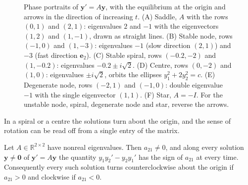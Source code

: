 \begin{figure}
{}
\caption{Phase portraits of $\mathbf y'=A\mathbf y$, with the equilibrium at the origin and arrows in the direction of increasing $t$. (A) Saddle, $A$ with the rows $(0,1)$ and $(2,1)$: eigenvalues $2$ and $-1$ with the eigenvectors $(1,2)$ and $(1,-1)$, drawn as straight lines. (B) Stable node, rows $(-1,0)$ and $(1,-3)$: eigenvalues $-1$ (slow direction $(2,1)$) and $-3$ (fast direction $\mathbf e_2$). (C) Stable spiral, rows $(-0.2,-2)$ and $(1,-0.2)$: eigenvalues $-0.2\pm i\sqrt2$. (D) Centre, rows $(0,-2)$ and $(1,0)$: eigenvalues $\pm i\sqrt2$, orbits the ellipses $y_1^2+2y_2^2=c$. (E) Degenerate node, rows $(-2,1)$ and $(-1,0)$: double eigenvalue $-1$ with the single eigenvector $(1,1)$. (F) Star, $A=-I$. For the unstable node, spiral, degenerate node and star, reverse the arrows.\label{fig:phase-portraits}}
\end{figure}

In a spiral or a centre the solutions turn about the origin, and the sense of rotation can be read off from a single entry of the matrix.

\begin{proposition}
\label{prop:rotation-sense}
Let $A\in\mathbb R^{2\times2}$ have nonreal eigenvalues. Then $a_{21}\ne0$, and along every solution $\mathbf y\ne\mathbf 0$ of $\mathbf y'=A\mathbf y$ the quantity $y_1y_2'-y_2y_1'$ has the sign of $a_{21}$ at every time. Consequently every such solution turns counterclockwise about the origin if $a_{21}>0$ and clockwise if $a_{21}<0$.
\end{proposition}

